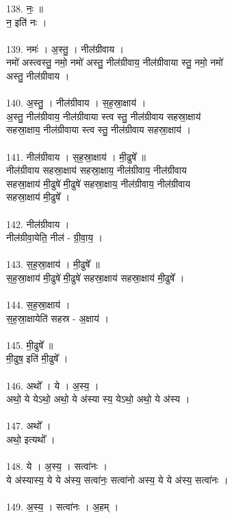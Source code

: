 138. नः॒ ॥\\
न॒ इति॑ नः ।\\
\\
139. नमः॑ । अ॒स्तु॒ । नील॑ग्रीवाय ।\\
नमो॑ अस्त्वस्तु॒ नमो॒ नमो॑ अस्तु॒ नील॑ग्रीवाय॒ नील॑ग्रीवाया स्तु॒ नमो॒ नमो॑\\
अस्तु॒ नील॑ग्रीवाय ।\\
\\
140. अ॒स्तु॒ । नील॑ग्रीवाय । स॒ह॒स्रा॒क्षाय॑ ।\\
अ॒स्तु॒ नील॑ग्रीवाय॒ नील॑ग्रीवाया स्त्व स्तु॒ नील॑ग्रीवाय सहस्रा॒क्षाय॑\\
सहस्रा॒क्षाय॒ नील॑ग्रीवाया स्त्व स्तु॒ नील॑ग्रीवाय सहस्रा॒क्षाय॑ ।\\
\\
141. नील॑ग्रीवाय । स॒ह॒स्रा॒क्षाय॑ । मी॒ढुषे᳚ ॥\\
नील॑ग्रीवाय सहस्रा॒क्षाय॑ सहस्रा॒क्षाय॒ नील॑ग्रीवाय॒ नील॑ग्रीवाय\\
सहस्रा॒क्षाय॑ मी॒ढुषे॑ मी॒ढुषे॑ सहस्रा॒क्षाय॒ नील॑ग्रीवाय॒ नील॑ग्रीवाय\\
सहस्रा॒क्षाय॑ मी॒ढुषे᳚ ।\\
\\
142. नील॑ग्रीवाय ।\\
नील॑ग्रीवा॒येति॒ नील॑ - ग्री॒वा॒य॒ ।\\
\\
143. स॒ह॒स्रा॒क्षाय॑ । मी॒ढुषे᳚ ॥\\
स॒ह॒स्रा॒क्षाय॑ मी॒ढुषे॑ मी॒ढुषे॑ सहस्रा॒क्षाय॑ सहस्रा॒क्षाय॑ मी॒ढुषे᳚ ।\\
\\
144. स॒ह॒स्रा॒क्षाय॑ ।\\
स॒ह॒स्रा॒क्षायेति॑ सहस्र - अ॒क्षाय॑ ।\\
\\
145. मी॒ढुषे᳚ ॥\\
मी॒ढुष॒ इति॑ मी॒ढुषे᳚ ।\\
\\
146. अथो᳚ । ये । अ॒स्य॒ ।\\
अथो॒ ये येऽथो॒ अथो॒ ये अ॑स्या स्य॒ येऽथो॒ अथो॒ ये अ॑स्य ।\\
\\
147. अथो᳚ ।\\
अथो॒ इत्यथो᳚ ।\\
\\
148. ये । अ॒स्य॒ । सत्वा॑नः ।\\
ये अ॑स्यास्य॒ ये ये अ॑स्य॒ सत्वा॑नः॒ सत्वा॑नो अस्य॒ ये ये अ॑स्य॒ सत्वा॑नः ।\\
\\
149. अ॒स्य॒ । सत्वा॑नः । अ॒हम् ।\\
